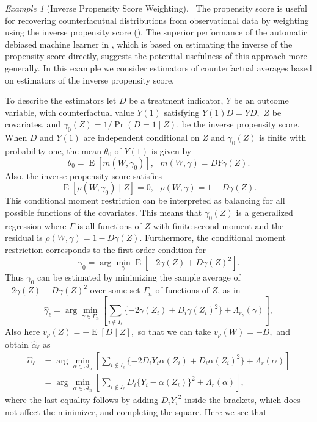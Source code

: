 \documentclass[aos]{imsart}
\numberwithin{equation}{section}
\theoremstyle{plain}
\theoremstyle{remark}
\newtheorem{example}{Example}
\DeclareMathOperator{\E}{E}
\begin{document}
\begin{example}[Inverse Propensity Score Weighting\label{ex:ips}]\
The propensity score is useful for recovering counterfacutual distributions from observational data by weighting using the inverse propensity score (\cite{horvitz1952generalization}).
The superior performance of the automatic debiased machine learner in \cite{chernozhukov2022riesznet}, which is based on estimating the inverse of the propensity score directly, suggests the potential usefulness of this approach more generally. In this example we consider estimators of counterfactual averages based on estimators of the inverse propensity score.

To describe the estimators let $D$ be a treatment indicator, $Y$ be an outcome 
variable, with counterfactual value $Y(1)$ satisfying $Y(1)D=YD,$ $Z$ be
covariates, and $\gamma_{0}(Z)=1/\Pr(D=1\mid Z).$ be the inverse propensity score.
When $D$ and $Y(1)$ are independent conditional on $Z$ and $\gamma_{0}(Z)$ is
finite with probability one, the mean $\theta_{0}$ of $Y(1)$ is given by%
\[
\theta_{0}=\E[m(W,\gamma_{0})],\text{ }m(W,\gamma)=DY\gamma(Z).
\]
Also, the inverse propensity score satisfies%
\[ \E[\rho(W,\gamma_{0})\mid Z]=0,\text{ }\rho(W,\gamma)=1-D\gamma(Z).
\]
This conditional moment restriction can be interpreted as balancing for all possible functions of the covariates. This means that $\gamma_{0}(Z)$ is a generalized regression where $\Gamma$ is all functions of $Z$ with finite second moment
and the residual is $\rho(W,\gamma)=1-D\gamma(Z)$. Furthermore, the
conditional moment restriction corresponds to the first order condition for %
\[
\gamma_{0}=\arg\min_{\gamma} \E[-2\gamma(Z)+D\gamma(Z)^{2}].
\]
Thus $\gamma_{0}$ can be estimated by minimizing the sample average of
$-2\gamma(Z)+D\gamma(Z)^{2}$ over some set $\Gamma_n$ of functions of $Z$, as in
\[
\hat{\gamma}_{\ell}=\arg\min_{\gamma\in\Gamma_n}\left[  \sum_{i\notin I_{\ell}%
}\{-2\gamma(Z_{i})+D_{i}\gamma(Z_{i})^{2}\}+\Lambda_{r_{\gamma}}%
(\gamma)\right]  ,
\]
Also here $v_{\rho}(Z)=-\E[D\mid Z],$ so that we can take $v_{\rho}(W)=-D,$ and obtain $\hat{\alpha}_{\ell}$ as%
\begin{align*}
\hat{\alpha}_{\ell}  & =\arg\min_{\alpha\in\mathcal{A}_{n}}[\sum_{i\notin
I_{\ell}}\{-2D_{i}Y_{i}\alpha(Z_{i})+D_{i}\alpha(Z_{i})^{2}%
\}+\Lambda_{r}(\alpha)]\\
& =\arg\min_{\alpha\in\mathcal{A}_{n}}[\sum_{i\notin I_{\ell}}D_{i}\{
{Y}_{i}-\alpha(Z_{i})\}^{2}+\Lambda_{r}(\alpha)],
\end{align*}
where the last equality follows by adding $D_i{Y_i}^2$ inside the brackets, which does not affect the minimizer, and completing the square. Here we see that 

\end{example}
\end{document}
